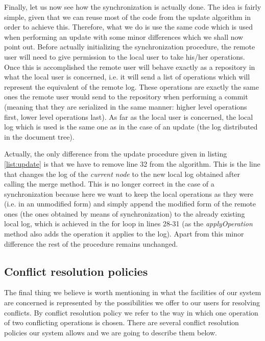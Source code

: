 Finally, let us now see how the synchronization is actually done. The idea is fairly simple, given that
we can reuse most of the code from the update algorithm in order to achieve this. Therefore, what we
do is use the same code which is used when performing an update with some minor differences which we
shall now point out. Before actually initializing the synchronization procedure, the remote
user will need to give permission to the local user to take his/her operations. Once this is accomplished
the remote user will behave exactly as a repository in what the local user is concerned, i.e. it will
send a list of operations which will represent the equivalent of the remote log. These operations
are exactly the same ones the remote user would send to the repository when performing a commit (meaning
that they are serialized in the same manner: higher level operations first, lower level operations last).
As far as the local user is concerned, the local log which is used is the same one as in the case of an
update (the log distributed in the document tree).

Actually, the only difference from the update procedure given in listing \ref{list:update} is that we have
to remove line 32 from the algorithm. This is the line that changes the log of the \emph{current node} to
the new local log obtained after calling the merge method. This is no longer correct in the case of a
synchronization because here we want to keep the local operations as they were (i.e. in an unmodified form)
and simply append the modified form of the remote ones (the ones obtained by means of synchronization)
to the already existing local log, which is achieved in the for loop in lines 28-31 (as the
\emph{applyOperation} method also adds the operation it applies to the log). Apart from this minor difference
the rest of the procedure remains unchanged.

\subsection{Conflict resolution policies}
\label{sec:confres}

The final thing we believe is worth mentioning in what the facilities of our system are concerned is represented
by the possibilities we offer to our users for resolving conflicts. By conflict
resolution policy we refer to the way in which one operation of two conflicting operations is chosen. There
are several conflict resolution policies our system allows and we are going to describe them below.

